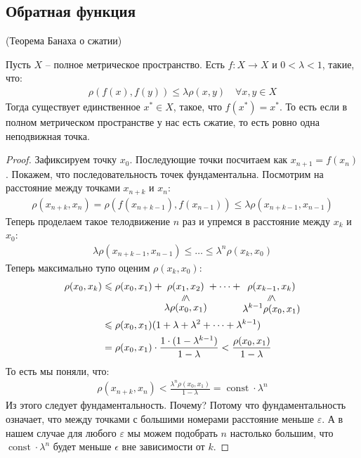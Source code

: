 \subsection{Обратная функция}
\begin{theorem} (Теорема Банаха о сжатии)

    Пусть $X$ -- полное метрическое пространство. Есть $f: X \longrightarrow X$ и $0 < \lambda < 1$, такие, что:
    \begin{gather*}
        \rho(f(x), f(y)) \leqslant \lambda \rho(x, y) \quad \forall x, y \in X
    \end{gather*}
    Тогда существует единственное $x^* \in X$, такое, что $f(x^*) = x^*$. 
    То есть если в полном метрическом пространстве у нас есть сжатие, то есть ровно одна неподвижная точка. 
\end{theorem}
\begin{proof}
    Зафиксируем точку $x_0$. Последующие точки посчитаем как $x_{n+1} = f(x_n)$. 
    Покажем, что последовательность точек фундаментальна. Посмотрим на расстояние между точками $x_{n+k}$ и $x_{n}$:
    \begin{gather*}
        \rho(x_{n+k}, x_n) = \rho(f(x_{n+k-1}), f(x_{n-1})) \leqslant \lambda \rho(x_{n+k-1}, x_{n-1})
    \end{gather*}
    Теперь проделаем такое телодвижение $n$ раз и упремся в расстояние между $x_k$ и $x_0$:
    \begin{gather*}
        \lambda \rho(x_{n+k-1}, x_{n-1}) \leqslant \dots \leqslant \lambda^n \rho(x_k, x_0)
    \end{gather*}
    Теперь максимально тупо оценим $\rho(x_k, x_0)$: 
    \begin{align*}
        \rho(x_0, x_k) &\leqslant \rho(x_0, x_1) + \lessbelow{\rho(x_1, x_2)}{\lambda \rho(x_0, x_1)} + \dots + \lessbelow{\rho(x_{k-1}, x_k)}{\lambda^{k-1} \rho(x_0, x_1)} \\
        &\leqslant \rho(x_0, x_1) (1 + \lambda + \lambda^2 + \dots + \lambda^{k-1}) \\
        &= \rho(x_0, x_1) \cdot \frac{1 \cdot (1 - \lambda^{k-1})}{1 - \lambda} < \frac{\rho(x_0, x_1)}{1 - \lambda}
    \end{align*}
    То есть мы поняли, что:
    \begin{gather*}
        \rho(x_{n+k}, x_n) < \frac{\lambda^n \rho(x_0, x_1)}{1 - \lambda} = \operatorname{const} \cdot \lambda^n
    \end{gather*}
    Из этого следует фундаментальность. Почему? Потому что фундаментальность означает, что между точками с большими номерами расстояние 
    меньше $\varepsilon$. А в нашем случае для любого $\varepsilon$ мы можем подобрать $n$ настолько большим, 
    что $\operatorname{const} \cdot \lambda^n$ будет меньше $\epsilon$ вне зависимости от $k$.


\end{proof}
